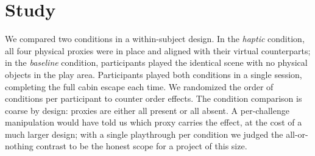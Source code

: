 
\section{Study}
\label{sec:study}

We compared two conditions in a within-subject design. In the \emph{haptic} condition, all four physical proxies were in place and aligned with their virtual counterparts; in the \emph{baseline} condition, participants played the identical scene with no physical objects in the play area. Participants played both conditions in a single session, completing the full cabin escape each time. We randomized the order of conditions per participant to counter order effects. The condition comparison is coarse by design: proxies are either all present or all absent. A per-challenge manipulation would have told us which proxy carries the effect, at the cost of a much larger design; with a single playthrough per condition we judged the all-or-nothing contrast to be the honest scope for a project of this size.




